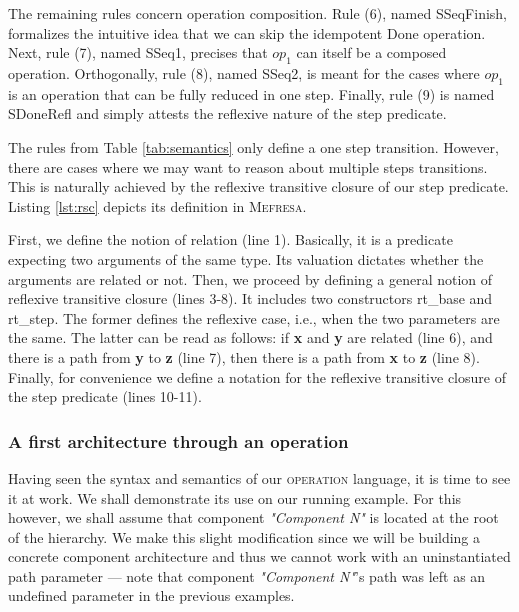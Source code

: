 		The remaining rules concern \textsf{operation} composition. Rule (6), named \textsf{SSeqFinish},
	formalizes the intuitive idea that we can skip the idempotent \textsf{Done} operation. Next,
	rule (7), named \textsf{SSeq1}, precises that $op_1$ can itself be a composed \textsf{operation}.
	Orthogonally, rule (8), named \textsf{SSeq2}, is meant for the cases where
	$op_1$ is an \textsf{operation} that can be fully reduced in one step. Finally,
	rule (9) is named \textsf{SDoneRefl} and simply attests the reflexive nature of the
	\textsf{step} predicate.


 The rules from Table \ref{tab:semantics} only define a one step transition. 
 However, there are cases where we may want to reason
  about multiple steps transitions. This is naturally achieved by the reflexive transitive closure of
  our \textsf{step} predicate. Listing \ref{lst:rsc} depicts its definition in \textsc{Mefresa}.
  
  
  		


	\noindent First, we define the notion of \textsf{relation} (line 1). Basically, it is a predicate expecting two
	arguments of the same type. Its valuation dictates whether the arguments are related or not. Then, we proceed
	by defining a general notion of reflexive transitive closure (lines 3-8). It includes two constructors
	\textsf{rt\_base} and \textsf{rt\_step}. The former defines the reflexive case, i.e., when the two parameters
	are the same. The latter can be read as follows: if \textbf{x} and \textbf{y} are related (line 6), and there
	is a path from \textbf{y} to \textbf{z} (line 7), then there is a path from \textbf{x} to \textbf{z} (line 8).
	Finally, for convenience we define a notation for the reflexive transitive closure of the \textsf{step} predicate (lines 10-11).


\subsubsection{A first architecture through an \textsf{operation}}

	
		Having seen the syntax and semantics of our \textsc{operation} language, it is time to see it at work.
	We shall demonstrate its use on our running example. For this however, we shall assume that
	\textsf{component} \textit{"Component N"} is located at the root of the hierarchy. We make this 
	slight modification since we will be building a concrete \textsf{component} architecture and thus
	we cannot work with an uninstantiated \textsf{path} parameter --- note that \textsf{component} \textit{"Component N"}'s
	\textsf{path} was left as an undefined parameter in the previous examples.
		

